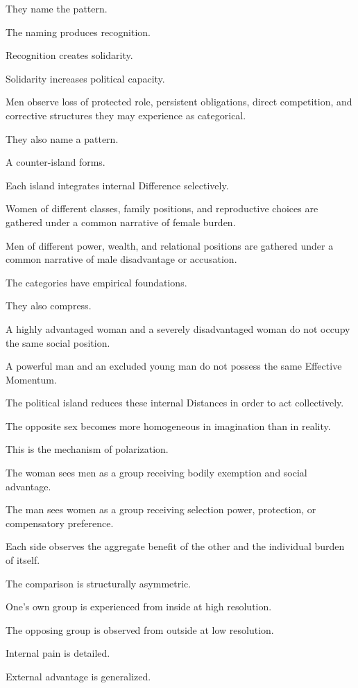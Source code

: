 They name the pattern.

The naming produces recognition.

Recognition creates solidarity.

Solidarity increases political capacity.

Men observe loss of protected role, persistent obligations, direct competition, and corrective structures they may experience as categorical.

They also name a pattern.

A counter-island forms.

Each island integrates internal Difference selectively.

Women of different classes, family positions, and reproductive choices are gathered under a common narrative of female burden.

Men of different power, wealth, and relational positions are gathered under a common narrative of male disadvantage or accusation.

The categories have empirical foundations.

They also compress.

A highly advantaged woman and a severely disadvantaged woman do not occupy the same social position.

A powerful man and an excluded young man do not possess the same Effective Momentum.

The political island reduces these internal Distances in order to act collectively.

The opposite sex becomes more homogeneous in imagination than in reality.

This is the mechanism of polarization.

The woman sees men as a group receiving bodily exemption and social advantage.

The man sees women as a group receiving selection power, protection, or compensatory preference.

Each side observes the aggregate benefit of the other and the individual burden of itself.

The comparison is structurally asymmetric.

One’s own group is experienced from inside at high resolution.

The opposing group is observed from outside at low resolution.

Internal pain is detailed.

External advantage is generalized.

